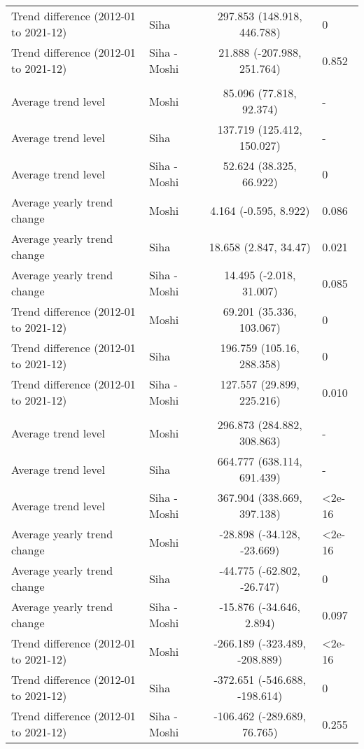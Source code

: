 \begin{longtable}{l|lcl}
Trend difference (2012-01 to 2021-12) & Siha & 297.853 (148.918, 446.788) & 0 \\ 
Trend difference (2012-01 to 2021-12) & Siha - Moshi & 21.888 (-207.988, 251.764) & 0.852 \\ 
\midrule\addlinespace[2.5pt]
\multicolumn{4}{l}{Infectious Eye Disease} \\ 
\midrule\addlinespace[2.5pt]
Average trend level & Moshi & 85.096 (77.818, 92.374) & - \\ 
Average trend level & Siha & 137.719 (125.412, 150.027) & - \\ 
Average trend level & Siha - Moshi & 52.624 (38.325, 66.922) & 0 \\ 
Average yearly trend change & Moshi & 4.164 (-0.595, 8.922) & 0.086 \\ 
Average yearly trend change & Siha & 18.658 (2.847, 34.47) & 0.021 \\ 
Average yearly trend change & Siha - Moshi & 14.495 (-2.018, 31.007) & 0.085 \\ 
Trend difference (2012-01 to 2021-12) & Moshi & 69.201 (35.336, 103.067) & 0 \\ 
Trend difference (2012-01 to 2021-12) & Siha & 196.759 (105.16, 288.358) & 0 \\ 
Trend difference (2012-01 to 2021-12) & Siha - Moshi & 127.557 (29.899, 225.216) & 0.010 \\ 
\midrule\addlinespace[2.5pt]
\multicolumn{4}{l}{Intestinal Worms} \\ 
\midrule\addlinespace[2.5pt]
Average trend level & Moshi & 296.873 (284.882, 308.863) & - \\ 
Average trend level & Siha & 664.777 (638.114, 691.439) & - \\ 
Average trend level & Siha - Moshi & 367.904 (338.669, 397.138) & <2e-16 \\ 
Average yearly trend change & Moshi & -28.898 (-34.128, -23.669) & <2e-16 \\ 
Average yearly trend change & Siha & -44.775 (-62.802, -26.747) & 0 \\ 
Average yearly trend change & Siha - Moshi & -15.876 (-34.646, 2.894) & 0.097 \\ 
Trend difference (2012-01 to 2021-12) & Moshi & -266.189 (-323.489, -208.889) & <2e-16 \\ 
Trend difference (2012-01 to 2021-12) & Siha & -372.651 (-546.688, -198.614) & 0 \\ 
Trend difference (2012-01 to 2021-12) & Siha - Moshi & -106.462 (-289.689, 76.765) & 0.255 \\ 

\end{longtable}
